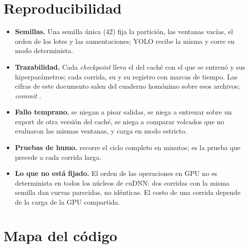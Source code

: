 \documentclass[12pt,a4paper]{article}
\begin{document}
\section{Reproducibilidad}

\begin{itemize}
    \item \textbf{Semillas.} Una semilla única (42) fija la partición, las ventanas vacías, el
          orden de los lotes y las aumentaciones; YOLO recibe la misma y corre en modo
          determinista.
    \item \textbf{Trazabilidad.} Cada \emph{checkpoint} lleva el  del caché
          con el que se entrenó y sus hiperparámetros; cada corrida, su  y su
          registro con marcas de tiempo. Las cifras de este documento salen del cuaderno homónimo
          sobre esos archivos; \emph{commit} \code{\commit}.
    \item \textbf{Fallo temprano.}  se niegan a pisar salidas,
           se niega a entrenar sobre un export de otra versión del
          caché,  se niega a comparar volcados que no evaluaron las
          mismas ventanas, y  carga en modo estricto.
    \item \textbf{Pruebas de humo.}  recorre el ciclo
          completo en minutos; es la prueba que precede a cada corrida larga.
    \item \textbf{Lo que no está fijado.} El orden de las operaciones en GPU no es determinista
          en todos los núcleos de cuDNN: dos corridas con la misma semilla dan curvas parecidas,
          no idénticas. El costo de una corrida depende de la carga de la GPU compartida.
\end{itemize}


\section{Mapa del código}
\end{document}

